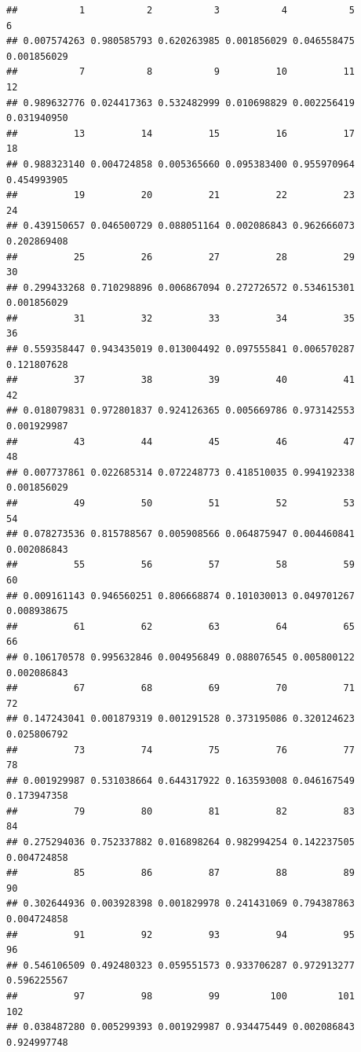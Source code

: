 \documentclass[
]{article}
\begin{document}
\begin{verbatim}
##           1           2           3           4           5           6 
## 0.007574263 0.980585793 0.620263985 0.001856029 0.046558475 0.001856029 
##           7           8           9          10          11          12 
## 0.989632776 0.024417363 0.532482999 0.010698829 0.002256419 0.031940950 
##          13          14          15          16          17          18 
## 0.988323140 0.004724858 0.005365660 0.095383400 0.955970964 0.454993905 
##          19          20          21          22          23          24 
## 0.439150657 0.046500729 0.088051164 0.002086843 0.962666073 0.202869408 
##          25          26          27          28          29          30 
## 0.299433268 0.710298896 0.006867094 0.272726572 0.534615301 0.001856029 
##          31          32          33          34          35          36 
## 0.559358447 0.943435019 0.013004492 0.097555841 0.006570287 0.121807628 
##          37          38          39          40          41          42 
## 0.018079831 0.972801837 0.924126365 0.005669786 0.973142553 0.001929987 
##          43          44          45          46          47          48 
## 0.007737861 0.022685314 0.072248773 0.418510035 0.994192338 0.001856029 
##          49          50          51          52          53          54 
## 0.078273536 0.815788567 0.005908566 0.064875947 0.004460841 0.002086843 
##          55          56          57          58          59          60 
## 0.009161143 0.946560251 0.806668874 0.101030013 0.049701267 0.008938675 
##          61          62          63          64          65          66 
## 0.106170578 0.995632846 0.004956849 0.088076545 0.005800122 0.002086843 
##          67          68          69          70          71          72 
## 0.147243041 0.001879319 0.001291528 0.373195086 0.320124623 0.025806792 
##          73          74          75          76          77          78 
## 0.001929987 0.531038664 0.644317922 0.163593008 0.046167549 0.173947358 
##          79          80          81          82          83          84 
## 0.275294036 0.752337882 0.016898264 0.982994254 0.142237505 0.004724858 
##          85          86          87          88          89          90 
## 0.302644936 0.003928398 0.001829978 0.241431069 0.794387863 0.004724858 
##          91          92          93          94          95          96 
## 0.546106509 0.492480323 0.059551573 0.933706287 0.972913277 0.596225567 
##          97          98          99         100         101         102 
## 0.038487280 0.005299393 0.001929987 0.934475449 0.002086843 0.924997748 

\end{verbatim}
\end{document}
